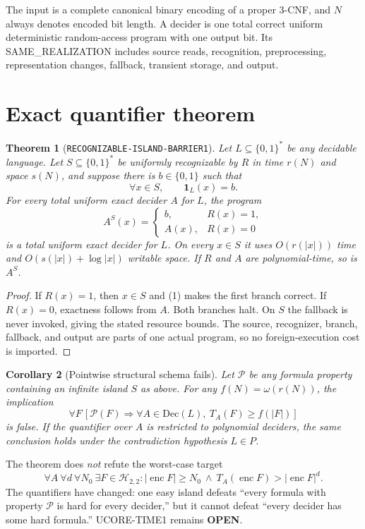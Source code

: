 \documentclass[11pt]{article}
\newtheorem{theorem}{Theorem}
\newtheorem{corollary}[theorem]{Corollary}
\newcommand{\Htwo}{\mathcal H_{2,2}}
\newcommand{\OPEN}{\textbf{OPEN}}
\begin{document}
The input is a complete canonical binary encoding of a proper 3-CNF, and
$N$ always denotes encoded bit length.  A decider is one total correct
uniform deterministic random-access program with one output bit.  Its
SAME\_REALIZATION includes source reads, recognition, preprocessing,
representation changes, fallback, transient storage, and output.

\section{Exact quantifier theorem}

\begin{theorem}[\texttt{RECOGNIZABLE-ISLAND-BARRIER1}]
Let $L\subseteq\{0,1\}^*$ be any decidable language.  Let
$S\subseteq\{0,1\}^*$ be uniformly recognizable by $R$ in time $r(N)$ and
space $s(N)$, and suppose there is $b\in\{0,1\}$ such that
\[
 \forall x\in S,\qquad \mathbf 1_L(x)=b.                 \tag{1}
\]
For every total uniform exact decider $A$ for $L$, the program
\[
 A^{S}(x)=
 \begin{cases}
 b,&R(x)=1,\\
 A(x),&R(x)=0
 \end{cases}                                             \tag{2}
\]
is a total uniform exact decider for $L$.  On every $x\in S$ it uses
$O(r(|x|))$ time and $O(s(|x|)+\log |x|)$ writable space.  If $R$ and $A$
are polynomial-time, so is $A^S$.
\end{theorem}
\begin{proof}
If $R(x)=1$, then $x\in S$ and (1) makes the first branch correct.  If
$R(x)=0$, exactness follows from $A$.  Both branches halt.  On $S$ the
fallback is never invoked, giving the stated resource bounds.  The source,
recognizer, branch, fallback, and output are parts of one actual program, so
no foreign-execution cost is imported.
\end{proof}

\begin{corollary}[Pointwise structural schema fails]
Let $\mathcal P$ be any formula property containing an infinite island $S$
as above.  For any $f(N)=\omega(r(N))$, the implication
\[
 \forall F\,[\mathcal P(F)\Rightarrow
   \forall A\in\mathrm{Dec}(L),\ T_A(F)\ge f(|F|)]       \tag{3}
\]
is false.  If the quantifier over $A$ is restricted to polynomial deciders,
the same conclusion holds under the contradiction hypothesis $L\in P$.
\end{corollary}

The theorem does \emph{not} refute the worst-case target
\[
\tag{UCORE-TIME1}
 \forall A\ \forall d\ \forall N_0\ \exists F\in\Htwo:
 |\operatorname{enc}F|\ge N_0\ \land\
 T_A(\operatorname{enc}F)>|\operatorname{enc}F|^d.
\]
The quantifiers have changed: one easy island defeats ``every formula with
property $\mathcal P$ is hard for every decider,'' but it cannot defeat
``every decider has some hard formula.''  UCORE-TIME1 remains \OPEN.
\end{document}
